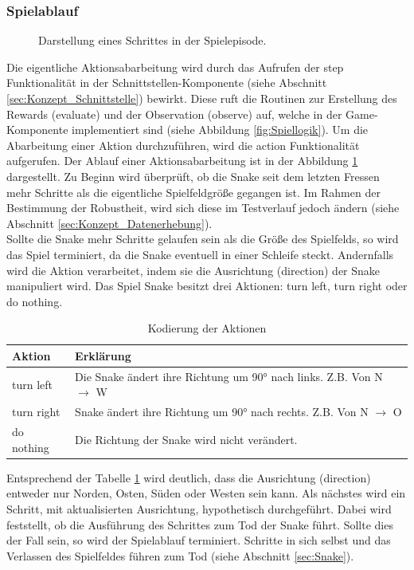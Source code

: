 \subsubsection{Spielablauf} \label{sec:Konzept_Spielablauf}
\begin{figure}[H]
	\centering
	\def\svgscale{0.11}
	
	\caption[Spielablauf]{Darstellung eines Schrittes in der Spielepisode.}
	\label{fig:Spielablauf}
\end{figure}
Die eigentliche Aktionsabarbeitung wird durch das Aufrufen der step Funktionalität in der Schnittstellen-Komponente (siehe Abschnitt \ref{sec:Konzept_Schnittstelle}) bewirkt. Diese ruft die Routinen zur Erstellung des Rewards (evaluate) und der Observation (observe) auf, welche in der Game-Komponente implementiert sind (siehe Abbildung \ref{fig:Spiellogik}).
Um die Abarbeitung einer Aktion durchzuführen, wird die action Funktionalität aufgerufen. Der Ablauf einer Aktionsabarbeitung ist in der Abbildung \ref{fig:Spielablauf} dargestellt.
Zu Beginn wird überprüft, ob die Snake seit dem letzten Fressen mehr Schritte als die eigentliche Spielfeldgröße gegangen ist. 
Im Rahmen der Bestimmung der Robustheit, wird sich diese im Testverlauf jedoch ändern (siehe Abschnitt \ref{sec:Konzept_Datenerhebung}).\\
Sollte die Snake mehr Schritte gelaufen sein als die Größe des Spielfelds, so wird das Spiel terminiert, da die Snake eventuell in einer Schleife steckt.
Andernfalls wird die Aktion verarbeitet, indem sie die Ausrichtung (direction) der Snake manipuliert wird. Das Spiel Snake besitzt drei Aktionen: turn left, turn right oder do nothing.
\begin{longtable}[h]{|p{4cm}|p{\linewidth - 5cm}|}
	\caption{Kodierung der Aktionen}
	\label{tab:Aktionscodierung} 
	\endfirsthead
	\endhead
	\hline
	Aktion & Erklärung \\
	\hline
	turn left & Die Snake ändert ihre Richtung um 90° nach links. Z.B. Von N $\longrightarrow$ W \\
	\hline
	turn right & Snake ändert ihre Richtung um 90° nach rechts. Z.B. Von N $\longrightarrow$ O \\
	\hline
	do nothing & Die Richtung der Snake wird nicht verändert. \\
	\hline
\end{longtable}
Entsprechend der Tabelle \ref{tab:Aktionscodierung} wird deutlich, dass die Ausrichtung (direction) entweder nur Norden, Osten, Süden oder Westen sein kann.
Als nächstes wird ein Schritt, mit aktualisierten Ausrichtung, hypothetisch durchgeführt. Dabei wird feststellt, ob die Ausführung des Schrittes zum Tod der Snake führt. Sollte dies der Fall sein, so wird der Spielablauf terminiert. Schritte in sich selbst und das Verlassen des Spielfeldes führen zum Tod (siehe Abschnitt \ref{sec:Snake}).\\ 

